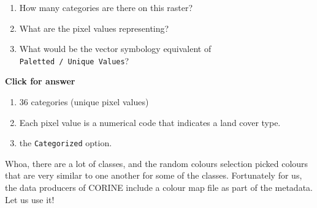 \documentclass[
  letterpaper,
  DIV=11,
  numbers=noendperiod]{scrreprt}
\begin{document}
\begin{tcolorbox}[enhanced jigsaw, coltitle=black, toprule=.15mm, breakable, opacitybacktitle=0.6, left=2mm, colback=white, leftrule=.75mm, rightrule=.15mm, colbacktitle=quarto-callout-important-color!10!white, toptitle=1mm, titlerule=0mm, colframe=quarto-callout-important-color-frame, arc=.35mm, bottomtitle=1mm, opacityback=0, bottomrule=.15mm, title=\textcolor{quarto-callout-important-color}{\faExclamation}\hspace{0.5em}{Stop and Think}]

\begin{enumerate}
\def\labelenumi{\alph{enumi})}
\item
  How many categories are there on this raster?
\item
  What are the pixel values representing?
\item
  What would be the vector symbology equivalent of
  \texttt{Paletted\ /\ Unique\ Values}?
\end{enumerate}

\end{tcolorbox}

\begin{tcolorbox}[enhanced jigsaw, toprule=.15mm, breakable, left=2mm, colframe=quarto-callout-important-color-frame, colback=white, arc=.35mm, leftrule=.75mm, opacityback=0, rightrule=.15mm, bottomrule=.15mm]

\vspace{-3mm}\textbf{Click for answer}\vspace{3mm}

\begin{enumerate}
\def\labelenumi{\alph{enumi})}
\item
  36 categories (unique pixel values)
\item
  Each pixel value is a numerical code that indicates a land cover type.
\item
  the \texttt{Categorized} option.
\end{enumerate}

\end{tcolorbox}

Whoa, there are a lot of classes, and the random colours selection
picked colours that are very similar to one another for some of the
classes. Fortunately for us, the data producers of CORINE include a
colour map file as part of the metadata. Let us use it!
\end{document}
